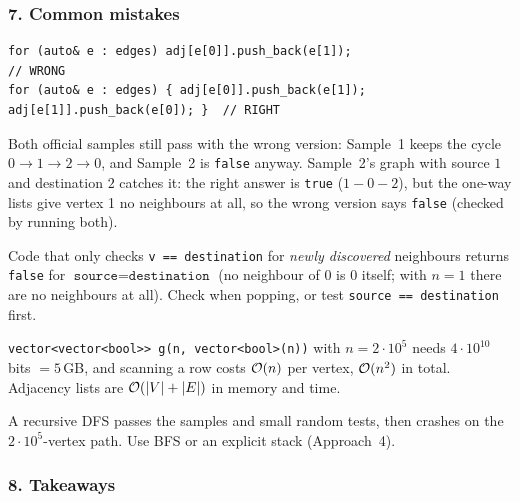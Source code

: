 \subsubsection*{7. Common mistakes}

\begin{warningbox}
\begin{lstlisting}[style=snippet]
for (auto& e : edges) adj[e[0]].push_back(e[1]);                          // WRONG
for (auto& e : edges) { adj[e[0]].push_back(e[1]); adj[e[1]].push_back(e[0]); }  // RIGHT
\end{lstlisting}
Both official samples still pass with the wrong version: Sample~1 keeps the cycle $0\to1\to2\to0$, and Sample~2 is \texttt{false} anyway. Sample~2's graph with source $1$ and destination $2$ catches it: the right answer is \texttt{true} ($1 - 0 - 2$), but the one-way lists give vertex 1 no neighbours at all, so the wrong version says \texttt{false} (checked by running both).
\end{warningbox}

\begin{warningbox}
Code that only checks \texttt{v == destination} for \emph{newly discovered} neighbours returns \texttt{false} for $\texttt{source} = \texttt{destination}$ (no neighbour of $0$ is $0$ itself; with $n=1$ there are no neighbours at all). Check when popping, or test \texttt{source == destination} first.
\end{warningbox}

\begin{warningbox}
\texttt{vector<vector<bool>> g(n, vector<bool>(n))} with $n = 2\cdot 10^5$ needs $4\cdot 10^{10}$ bits $= 5$\,GB, and scanning a row costs $\mathcal{O}(n)$ per vertex, $\mathcal{O}(n^2)$ in total. Adjacency lists are $\mathcal{O}(|V|+|E|)$ in memory and time.
\end{warningbox}

\begin{warningbox}
A recursive DFS passes the samples and small random tests, then crashes on the $2\cdot10^5$-vertex path. Use BFS or an explicit stack (Approach~4).
\end{warningbox}

\subsubsection*{8. Takeaways}

